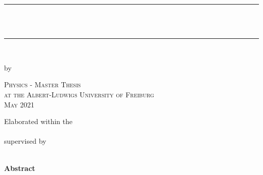 \newcommand{\HRule}{\rule{\linewidth}{0.2mm}}

\begin{titlepage}	
	\begin{center}

		\HRule \\[0.8cm]
		{ \huge \bfseries \vtitle}\\[0.4cm]
		\HRule \\[0.4cm]

		\vspace{10pt}

		{ \Large by \vauthor }

		\vspace{120pt}
		
		\textsc{\Large Physics - Master Thesis\\[0.5cm] 
			at the Albert-Ludwigs University of Freiburg\\[0.5cm]
			May 2021\\[0.5cm]}

		\vspace{100pt}	

		\Large{	Elaborated within the\\ 
			\vinstitute\\
			supervised by \\
 			\vsupervision\\}

	\end{center}
	\vspace{2cm}
\end{titlepage}
\pagebreak

\null\thispagestyle{empty}  %
\newpage

\mbox{}
\vspace{10pt}
\begin{center}
	\textbf{Abstract}\qquad
\end{center}
	\presummary



